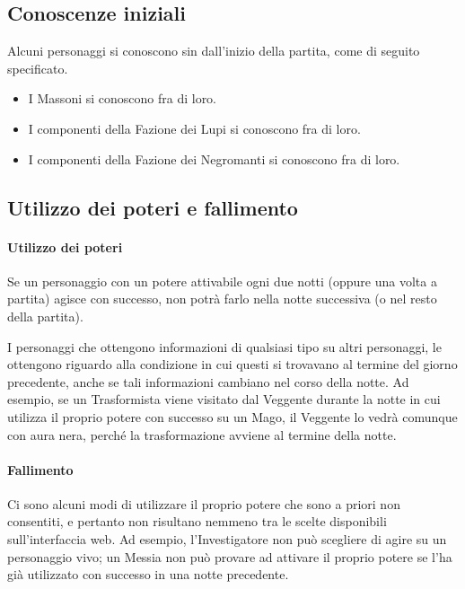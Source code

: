 \documentclass[a4paper,10pt]{article}
\begin{document}
\subsection{Conoscenze iniziali}

Alcuni personaggi si conoscono sin dall'inizio della partita, come di seguito specificato.

\begin{itemize}
	\item I Massoni si conoscono fra di loro.
	\item I componenti della Fazione dei Lupi si conoscono fra di loro.
	\item I componenti della Fazione dei Negromanti si conoscono fra di loro.
\end{itemize}

\subsection{Utilizzo dei poteri e fallimento}
\label{fallimento}

\paragraph{Utilizzo dei poteri} 

Se un personaggio con un potere attivabile ogni due notti (oppure una volta a partita) agisce con successo, non potrà farlo nella notte successiva (o nel resto della partita).

I personaggi che ottengono informazioni di qualsiasi tipo su altri personaggi, le ottengono riguardo alla condizione in cui questi si trovavano al termine del giorno precedente, anche se tali informazioni cambiano nel corso della notte.
Ad esempio, se un Trasformista viene visitato dal Veggente durante la notte in cui utilizza il proprio potere con successo su un Mago, il Veggente lo vedrà comunque con aura nera, perché la trasformazione avviene al termine della notte.

\paragraph{Fallimento} Ci sono alcuni modi di utilizzare il proprio potere che sono a priori non consentiti, e pertanto non risultano nemmeno tra le scelte disponibili sull'interfaccia web. Ad esempio, l'Investigatore non può scegliere di agire su un personaggio vivo; un Messia non può provare ad attivare il proprio potere se l'ha già utilizzato con successo in una notte precedente.
\end{document}
